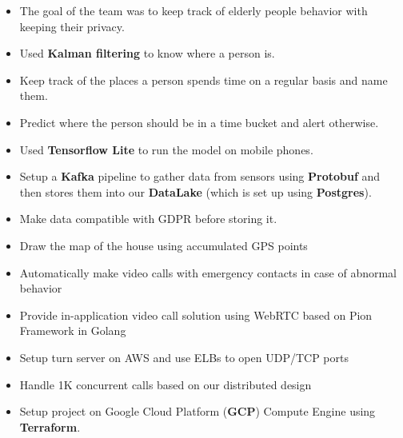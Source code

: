 \begin{itemize}
      \item The goal of the team was to keep track of elderly people behavior with keeping their privacy.
      \item Used \textbf{Kalman filtering} to know where a person is.
      \item Keep track of the places a person spends time on a regular basis and name them.
      \item Predict where the person should be in a time bucket and alert otherwise.
      \item Used \textbf{Tensorflow Lite} to run the model on mobile phones.
      \item Setup a \textbf{Kafka} pipeline to gather data from sensors using \textbf{Protobuf} and then stores them into our \textbf{DataLake} (which is set up using \textbf{Postgres}).
      \item Make data compatible with GDPR before storing it.
      \item Draw the map of the house using accumulated GPS points
      \item Automatically make video calls with emergency contacts in case of abnormal behavior
      \item Provide in-application video call solution using WebRTC based on Pion Framework in Golang
      \item Setup turn server on AWS and use ELBs to open UDP/TCP ports
      \item Handle 1K concurrent calls based on our distributed design
      \item Setup project on Google Cloud Platform (\textbf{GCP}) Compute Engine using \textbf{Terraform}.
\end{itemize}
